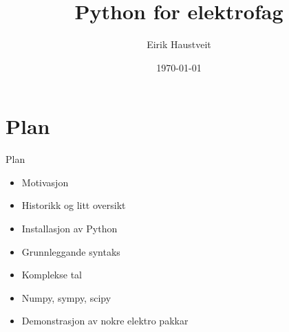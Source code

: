 \documentclass[10pt,a4paper]{beamer}
\title{Python for elektrofag}
\date{\today}
\author{Eirik Haustveit}
\institute{Institutt for datateknologi, elektroteknologi og realfag}
\begin{document}
	
	\titlepage

	\section{Plan}

	\begin{frame}{Plan}
		
          \begin{itemize}
                        \item Motivasjon
			\item Historikk og litt oversikt
                        \item Installasjon av Python
                        \item Grunnleggande syntaks
                        \item Komplekse tal
                        \item Numpy, sympy, scipy
			\item Demonstrasjon av nokre elektro pakkar
		\end{itemize}
		
	\end{frame}


	
	
	
	
		

    

    

    

    

    
    
    

	
	
	
	
\end{document}
